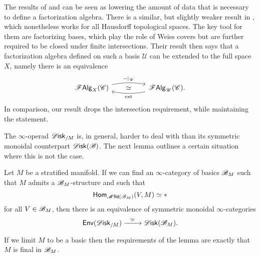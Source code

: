 \documentclass[../text]{subfiles}
\begin{document}
\begin{remark}
    The results of  and  can be seen as lowering the amount of data that is necessary to define a factorization algebra. There is a similar, but slightly weaker result in \cite[\S7.2]{cg2016}, which nonetheless works for all Hausdorff topological spaces. The key tool for them are factorizing bases, which play the role of Weiss covers but are further required to be closed under finite intersections. Their result then says that a factorization algebra defined on such a basis $\mathscr{U}$ can be extended to the full space $X$, namely there is an equivalence
    \begin{equation}
        \begin{tikzcd}
            \falg_X(\catC) \arrow[rr, bend left=10, "\mathrm{-|_{\mathscr{U}}}"] \arrow[rr, phantom, "\simeq"]&  & \falg_{\mathscr{U}}(\catC) \arrow[ll, bend left=10, "\mathrm{ext}"].
        \end{tikzcd}
    \end{equation}
    In comparison, our result drops the intersection requirement, while maintaining the statement.
\end{remark}

The $\infty$-operad $\disk_{/M}$ is, in general, harder to deal with than its symmetric monoidal counterpart $\disk(\bstr)$. The next lemma outlines a certain situation where this is not the case.

\begin{lemma}\label{lem:disk/M_to_disk}
    Let $M$ be a stratified manifold. If we can find an $\infty$-category of basics $\mathscr{B}_M$ such that $M$ admits a $\mathscr{B}_M$-structure and such that
    \begin{equation}
        \mathsf{Hom}_{\mfld(\bstr_M)} (V, M) \simeq *
    \end{equation}
    for all $V \in \mathscr{B}_M$, then there is an equivalence of symmetric monoidal $\infty$-categories
    \begin{equation}
        \mathsf{Env}(\disk_{/M}) \xrightarrow{\ \ \simeq \ \ } \disk(\bstr_M).
    \end{equation}
\end{lemma}

\begin{remark}
    If we limit $M$ to be a basic then the requirements of the lemma are exactly that $M$ is final in $\mathscr{B}_M$.
\end{remark}
\end{document}
